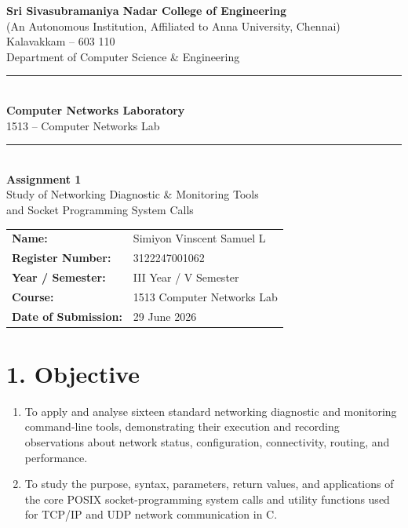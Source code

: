 \documentclass[11pt]{article}
\title{\vspace{-2cm}}
\date{}
\begin{document}
\begin{titlepage}
\centering
\vspace*{1cm}
{\large \textbf{Sri Sivasubramaniya Nadar College of Engineering}}\\
{\small (An Autonomous Institution, Affiliated to Anna University, Chennai)}\\
{\small Kalavakkam -- 603 110}\\[0.3cm]
{\small Department of Computer Science \& Engineering}\\[1.5cm]

\rule{\linewidth}{0.5mm}\\[0.4cm]
{\LARGE \textbf{Computer Networks Laboratory}}\\[0.3cm]
{\Large 1513 -- Computer Networks Lab}\\[0.4cm]
\rule{\linewidth}{0.5mm}\\[1.5cm]

{\huge \textbf{Assignment 1}}\\[0.4cm]
{\Large Study of Networking Diagnostic \& Monitoring Tools\\ and Socket Programming System Calls}\\[2cm]

\begin{center}
\begin{tabular}{ll}
\textbf{Name:} & Simiyon Vinscent Samuel L \\[0.2cm]
\textbf{Register Number:} & 3122247001062 \\[0.2cm]
\textbf{Year / Semester:} & III Year / V Semester \\[0.2cm]
\textbf{Course:} & 1513 Computer Networks Lab \\[0.2cm]
\textbf{Date of Submission:} & 29 June 2026 \\[0.2cm]
\end{tabular}
\end{center}

\vfill
\end{titlepage}

\section*{1. Objective}
\begin{enumerate}
  \item To apply and analyse sixteen standard networking diagnostic and monitoring
        command-line tools, demonstrating their execution and recording observations about
        network status, configuration, connectivity, routing, and performance.
  \item To study the purpose, syntax, parameters, return values, and applications of the
        core POSIX socket-programming system calls and utility functions used for TCP/IP and
        UDP network communication in C.
\end{enumerate}
\end{document}
